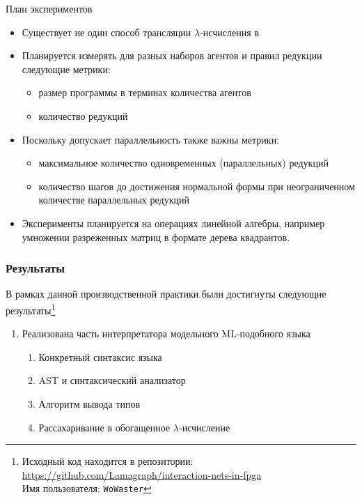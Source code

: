 \documentclass
  [ russian
  , aspectratio=169 %
  ] {beamer}
\begin{document}
\begin{frame}{План экспериментов}
    \begin{itemize}
        \item Существует не один способ трансляции $\lambda$-исчисления в \INs{}
        \item Планируется измерять для разных наборов агентов и правил редукции следующие метрики:
              \begin{itemize}
                  \item размер программы в терминах количества агентов
                  \item количество редукций
              \end{itemize}
        \item Поскольку \INs{} допускает параллельность также важны метрики:
              \begin{itemize}
                  \item максимальное количество одновременных (параллельных) редукций
                  \item количество шагов до достижения нормальной формы при неограниченном количестве параллельных редукций
              \end{itemize}
        \item Эксперименты планируется на операциях линейной алгебры, например умножении разреженных матриц в формате дерева квадрантов.
    \end{itemize}
\end{frame}

\begin{frame}
    \frametitle{Результаты}
    В рамках данной производственной практики были достигнуты следующие результаты\footnote[frame]{Исходный код находится в репозитории: \url{https://github.com/Lamagraph/interaction-nets-in-fpga} \\ Имя пользователя: \texttt{WoWaster}}
    \begin{enumerate}
        \item Реализована часть интерпретатора модельного ML-подобного языка
              \begin{enumerate}
                  \item Конкретный синтаксис языка
                  \item AST и синтаксический анализатор
                  \item Алгоритм вывода типов
                  \item Рассахаривание в обогащенное $\lambda$-исчисление
              \end{enumerate}
    \end{enumerate}
\end{frame}
\end{document}
